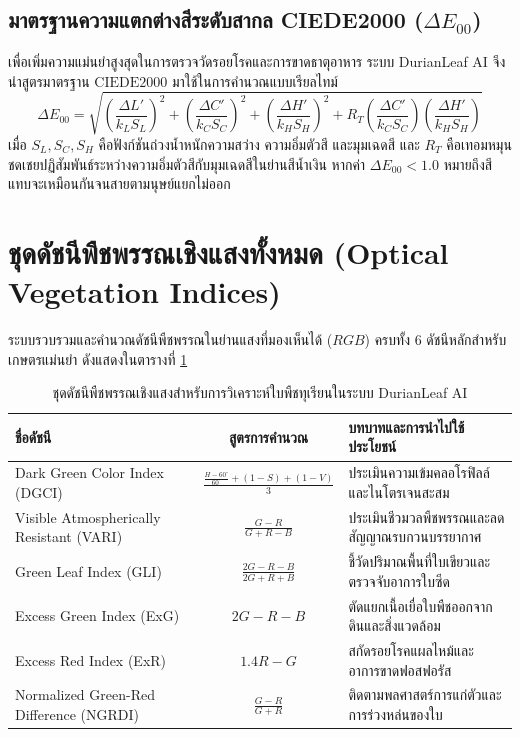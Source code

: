 \subsection{มาตรฐานความแตกต่างสีระดับสากล CIEDE2000 ($\Delta E_{00}$)}
เพื่อเพิ่มความแม่นยำสูงสุดในการตรวจวัดรอยโรคและการขาดธาตุอาหาร ระบบ DurianLeaf AI จึงนำสูตรมาตรฐาน $\text{CIEDE2000}$ มาใช้ในการคำนวณแบบเรียลไทม์
\begin{equation}
  \Delta E_{00} = \sqrt{ \left( \frac{\Delta L'}{k_L S_L} \right)^2 + \left( \frac{\Delta C'}{k_C S_C} \right)^2 + \left( \frac{\Delta H'}{k_H S_H} \right)^2 + R_T \left( \frac{\Delta C'}{k_C S_C} \right) \left( \frac{\Delta H'}{k_H S_H} \right) }
\end{equation}
เมื่อ $S_L, S_C, S_H$ คือฟังก์ชันถ่วงน้ำหนักความสว่าง ความอิ่มตัวสี และมุมเฉดสี และ $R_T$ คือเทอมหมุนชดเชยปฏิสัมพันธ์ระหว่างความอิ่มตัวสีกับมุมเฉดสีในย่านสีน้ำเงิน หากค่า $\Delta E_{00} < 1.0$ หมายถึงสีแทบจะเหมือนกันจนสายตามนุษย์แยกไม่ออก

\section{ชุดดัชนีพืชพรรณเชิงแสงทั้งหมด (Optical Vegetation Indices)}
ระบบรวบรวมและคำนวณดัชนีพืชพรรณในย่านแสงที่มองเห็นได้ ($RGB$) ครบทั้ง 6 ดัชนีหลักสำหรับเกษตรแม่นยำ ดังแสดงในตารางที่ \ref{tab:complete_indices}

\begin{table}[h]
\centering
\caption{ชุดดัชนีพืชพรรณเชิงแสงสำหรับการวิเคราะห์ใบพืชทุเรียนในระบบ DurianLeaf AI}
\label{tab:complete_indices}
\small
\begin{tabular}{|l|c|l|}
\hline
\textbf{ชื่อดัชนี} & \textbf{สูตรการคำนวณ} & \textbf{บทบาทและการนำไปใช้ประโยชน์} \\
\hline
Dark Green Color Index (DGCI) & $\frac{\frac{H - 60^\circ}{60^\circ} + (1 - S) + (1 - V)}{3}$ & ประเมินความเข้มคลอโรฟิลล์และไนโตรเจนสะสม \\
Visible Atmospherically Resistant (VARI) & $\frac{G - R}{G + R - B}$ & ประเมินชีวมวลพืชพรรณและลดสัญญาณรบกวนบรรยากาศ \\
Green Leaf Index (GLI) & $\frac{2G - R - B}{2G + R + B}$ & ชี้วัดปริมาณพื้นที่ใบเขียวและตรวจจับอาการใบซีด \\
Excess Green Index (ExG) & $2G - R - B$ & ตัดแยกเนื้อเยื่อใบพืชออกจากดินและสิ่งแวดล้อม \\
Excess Red Index (ExR) & $1.4R - G$ & สกัดรอยโรคแผลไหม้และอาการขาดฟอสฟอรัส \\
Normalized Green-Red Difference (NGRDI) & $\frac{G - R}{G + R}$ & ติดตามพลศาสตร์การแก่ตัวและการร่วงหล่นของใบ \\
\hline
\end{tabular}
\end{table}

